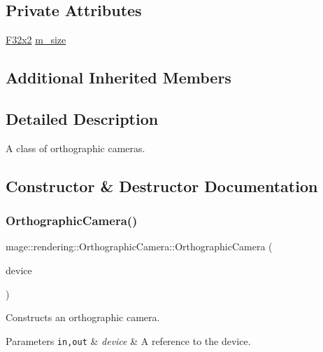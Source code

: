 \subsection*{Private Attributes}
\begin{DoxyCompactItemize}
\item 
\mbox{\hyperlink{namespacemage_aee4759dedc8def6c6dec26b5c7eddf29}{F32x2}} \mbox{\hyperlink{classmage_1_1rendering_1_1_orthographic_camera_ac83280a3b16a8ff6724e74f2f1e04653}{m\+\_\+size}}
\end{DoxyCompactItemize}
\subsection*{Additional Inherited Members}


\subsection{Detailed Description}
A class of orthographic cameras. 

\subsection{Constructor \& Destructor Documentation}
\mbox{\label{classmage_1_1rendering_1_1_orthographic_camera_aba148b4da1141b5fa3dfc684e86dfc16}} 
\subsubsection{\texorpdfstring{Orthographic\+Camera()}{OrthographicCamera()}\hspace{0.1cm}{\footnotesize\ttfamily [1/3]}}
{\footnotesize\ttfamily mage\+::rendering\+::\+Orthographic\+Camera\+::\+Orthographic\+Camera (\begin{DoxyParamCaption}\item[{I\+D3\+D11\+Device \&}]{device }\end{DoxyParamCaption})\hspace{0.3cm}{\ttfamily [explicit]}}

Constructs an orthographic camera.


\begin{DoxyParams}[1]{Parameters}
\mbox{\tt in,out}  & {\em device} & A reference to the device. \\
\hline
\end{DoxyParams}
\mbox{\label{classmage_1_1rendering_1_1_orthographic_camera_a0bd37447138230a1a4900f503a2d1299}} 
